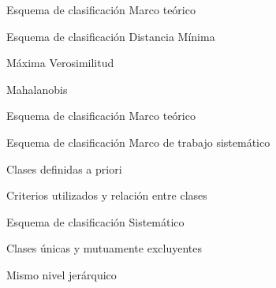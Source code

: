 \begin{frame}{}
\begin{block}{Esquema de clasificación}
  Marco teórico
\end{block}

\end{frame}
\begin{frame}{}
\begin{block}{Esquema de clasificación}
  Distancia Mínima\pause

  Máxima Verosimilitud \pause

  Mahalanobis
\end{block}

\end{frame}
\begin{frame}{}
\begin{block}{Esquema de clasificación}
  Marco teórico
\end{block}

\end{frame}
\begin{frame}{}
\begin{block}{Esquema de clasificación}
  Marco de trabajo sistemático\pause

  Clases definidas a priori \pause

  Criterios utilizados y relación entre clases
\end{block}

\end{frame}

\begin{frame}{}
\begin{block}{Esquema de clasificación}
 Sistemático\pause

  Clases únicas y mutuamente excluyentes\pause

  Mismo nivel jerárquico
\end{block}

\end{frame}


